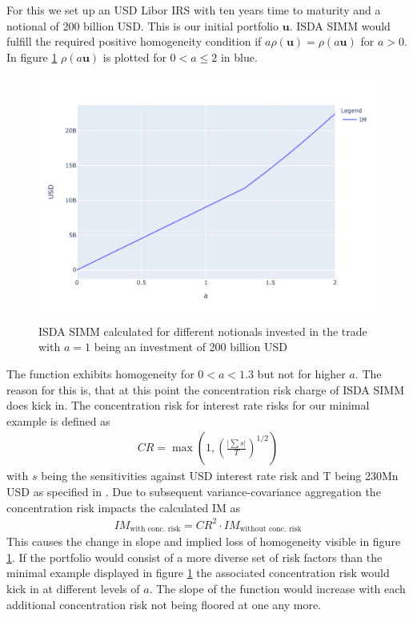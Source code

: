\documentclass[../Thesis_AHoecherl.tex]{subfiles}
\begin{document}
    For this we set up an USD Libor \gls{IRS} with ten years time to maturity and a notional of 200 billion USD. This is our initial portfolio $\mathbf{u}$. \gls{ISDA SIMM} would fulfill the required positive homogeneity condition if $a \rho(\mathbf{u}) = \rho(a \mathbf{u})$ for $a>0$. In figure \ref{fig:homogeneity of ISDA SIMM} $\rho(a\mathbf{u})$ is plotted for $0<a\leq 2$ in blue. 
    \begin{figure}
        \centering
        \includegraphics{Graphics/ISDA_SIMM_homogenity.pdf}
        \caption[Homogeneity of ISDA SIMM]{ISDA SIMM calculated for different notionals invested in the trade with $a=1$ being an investment of 200 billion USD}
        \label{fig:homogeneity of ISDA SIMM}
    \end{figure}
    The function exhibits homogeneity for $0<a<1.3$ but not for higher $a$. 
    The reason for this is, that at this point the concentration risk charge of \gls{ISDA SIMM} does kick in.
    The concentration risk for interest rate risks for our minimal example is defined as \cite[Article 7.b]{SIMM}
    \begin{align*}
        CR = \max\left(1,\left(\frac{\lvert\sum{s}\rvert}{T}\right)^{1/2}\right)
    \end{align*}
    with $s$ being the sensitivities against USD interest rate risk and T being 230Mn USD as specified in \cite[Article 74]{SIMM}. Due to subsequent variance-covariance aggregation the concentration risk impacts the calculated \gls{IM} as
    \begin{align*}
        IM_{\text{with conc. risk}} = CR^2 \cdot IM_{\text{without conc. risk}}
    \end{align*}
    This causes the change in slope and implied loss of homogeneity visible in figure \ref{fig:homogeneity of ISDA SIMM}. If the portfolio would consist of a more diverse set of risk factors than the minimal example displayed in figure \ref{fig:homogeneity of ISDA SIMM} the associated concentration risk would kick in at different levels of $a$.
    The slope of the function would increase with each additional concentration risk not being floored at one any more. 
    
\end{document}

